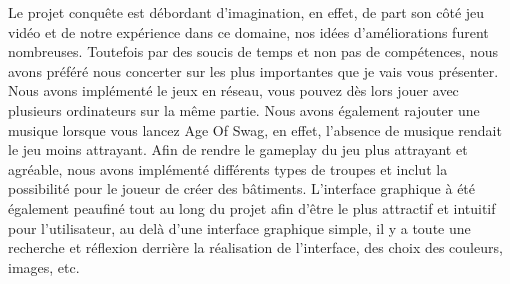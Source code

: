 Le projet conquête est débordant d'imagination, en effet, de part son côté jeu vidéo et de notre expérience dans ce domaine, nos idées d'améliorations furent nombreuses. Toutefois par des soucis de temps et non pas de compétences, nous avons préféré nous concerter sur les plus importantes que je vais vous présenter.
Nous avons implémenté le jeux en réseau, vous pouvez dès lors jouer avec plusieurs ordinateurs sur la même partie.
Nous avons également rajouter une musique lorsque vous lancez Age Of Swag, en effet, l'absence de musique rendait le jeu moins attrayant. Afin de rendre le gameplay du jeu plus attrayant et agréable, nous avons implémenté différents types de troupes et inclut la possibilité pour le joueur de créer des bâtiments.
L'interface graphique à été également peaufiné tout au long du projet afin d'être le plus attractif et intuitif pour l'utilisateur, au delà d'une interface graphique simple, il y a toute une recherche et réflexion derrière la réalisation de l'interface, des choix des couleurs, images, etc.
